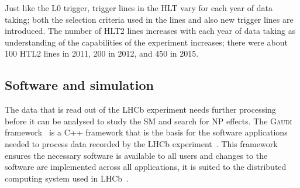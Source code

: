 Just like the L0 trigger, trigger lines in the HLT vary for each year of data taking; both the selection criteria used in the lines and also new trigger lines are introduced. The number of HLT2 lines increases with each year of data taking as understanding of the capabilities of the experiment increases; there were about 100 HTL2 lines in 2011, 200 in 2012, and 450 in 2015. 


\subsection{Software and simulation}
\label{SoftwareSimulation}

The data that is read out of the LHCb experiment needs further processing before it can be analysed to study the SM and search for NP effects. The \textsc{Gaudi} framework~\cite{Mato:1998gfa} is a C++ framework that is the basis for the software applications needed to process data recorded by the LHCb experiment~\cite{Antunes-Nobrega:835156}. This framework ensures the necessary software is available to all users and changes to the software are implemented across all applications, it is suited to the distributed computing system used in LHCb~\cite{Stagni:2012rs}. 


